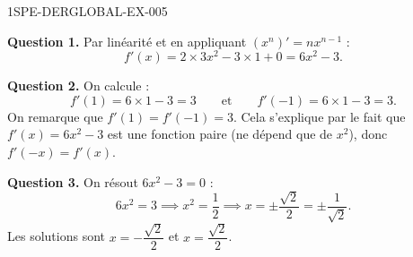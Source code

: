 \begin{corrige}{1SPE-DERGLOBAL-EX-005}

\textbf{Question 1.} Par linéarité et en appliquant $(x^n)' = nx^{n-1}$ :
\[
f'(x) = 2 \times 3x^2 - 3 \times 1 + 0 = \boxed{6x^2 - 3}.
\]

\textbf{Question 2.} On calcule :
\[
f'(1) = 6 \times 1 - 3 = 3 \qquad \text{et} \qquad f'(-1) = 6 \times 1 - 3 = 3.
\]
On remarque que $f'(1) = f'(-1) = 3$. Cela s'explique par le fait que $f'(x) = 6x^2 - 3$ est une fonction paire (ne dépend que de $x^2$), donc $f'(-x) = f'(x)$.

\textbf{Question 3.} On résout $6x^2 - 3 = 0$ :
\[
6x^2 = 3 \implies x^2 = \frac{1}{2} \implies x = \pm\frac{\sqrt{2}}{2} = \pm\frac{1}{\sqrt{2}}.
\]
Les solutions sont $\boxed{x = -\dfrac{\sqrt{2}}{2}}$ et $\boxed{x = \dfrac{\sqrt{2}}{2}}$.
\end{corrige}
